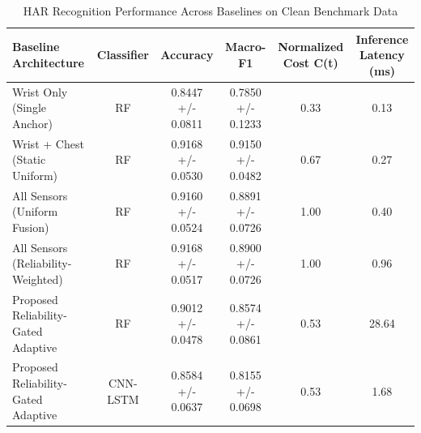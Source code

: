 \begin{table}[htbp]
\caption{HAR Recognition Performance Across Baselines on Clean Benchmark Data}
\label{tab:clean_comparison}
\centering
\begin{tabular}{lccccc}
\hline
Baseline Architecture & Classifier & Accuracy & Macro-F1 & Normalized Cost C(t) & Inference Latency (ms) \\ \hline
Wrist Only (Single Anchor) & RF & 0.8447 +/- 0.0811 & 0.7850 +/- 0.1233 & 0.33 & 0.13 \\
Wrist + Chest (Static Uniform) & RF & 0.9168 +/- 0.0530 & 0.9150 +/- 0.0482 & 0.67 & 0.27 \\
All Sensors (Uniform Fusion) & RF & 0.9160 +/- 0.0524 & 0.8891 +/- 0.0726 & 1.00 & 0.40 \\
All Sensors (Reliability-Weighted) & RF & 0.9168 +/- 0.0517 & 0.8900 +/- 0.0726 & 1.00 & 0.96 \\
Proposed Reliability-Gated Adaptive & RF & 0.9012 +/- 0.0478 & 0.8574 +/- 0.0861 & 0.53 & 28.64 \\
Proposed Reliability-Gated Adaptive & CNN-LSTM & 0.8584 +/- 0.0637 & 0.8155 +/- 0.0698 & 0.53 & 1.68 \\
\hline
\end{tabular}
\end{table}
